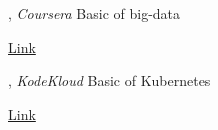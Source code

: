 , \textit{Coursera} \hfill	Basic of big-data

\href{https://www.coursera.org/account/accomplishments/certificate/HCWDJDB6T8YM}{Link}

, \textit{KodeKloud} \hfill Basic of Kubernetes

\href{https://learn.kodekloud.com/user/certificate/948643ee-97c5-4ee2-be30-5e38d96b6c4e}{Link}